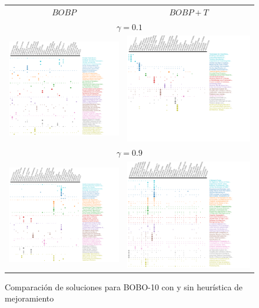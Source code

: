 \begin{figure}[H]
	\centering
	\begin{tabular}{cc}
		$BOBP$ & $BOBP+T$\\
		\multicolumn{2}{c}{$\gamma=0.1$}\\
		\includegraphics[width=0.45\linewidth]{img/gamma-01-alg-3.png}&
		\includegraphics[width=0.45\linewidth]{img/gamma-01-alg-4.png}\vspace{1cm}\\
		\multicolumn{2}{c}{$\gamma=0.9$}\\
		\includegraphics[width=0.45\linewidth]{img/gamma-09-alg-3.png}&
		\includegraphics[width=0.45\linewidth]{img/gamma-09-alg-4.png}\\
	\end{tabular}
	\caption{Comparación de soluciones para BOBO-10 con y sin heurística de mejoramiento}
	\label{res:bobo}
\end{figure}


